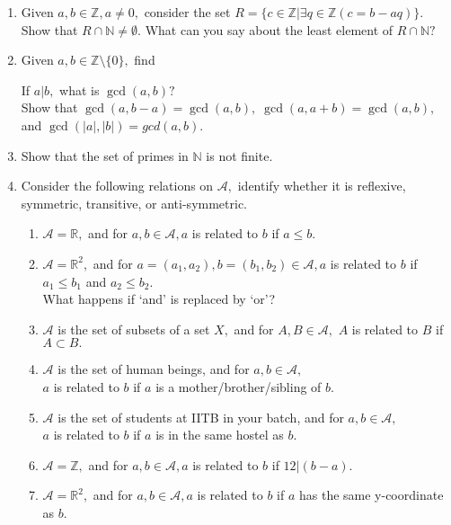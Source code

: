 \begin{enumerate}[label=(\arabic*)]
	\item Given $a, b \in \mathbb{Z}, a\neq0,$ consider the set $R = \{c \in \mathbb{Z}| \exists q \in \mathbb{Z}(c = b - aq)\}.$ Show that $R\cap\mathbb{N}\neq\emptyset.$ What can you say about the least element of $R\cap\mathbb{N}?$
	\item Given $a, b \in \mathbb{Z}\setminus\{0\},$ find
	If $a|b,$ what is $\gcd(a, b)?$\\
	Show that $\gcd(a, b-a) = \gcd(a, b),\;\gcd(a, a+b) = \gcd(a, b),$ and $\gcd(|a|, |b|) = gcd(a, b).$
	\item Show that the set of primes in $\mathbb{N}$ is not finite.
	\item Consider the following relations on $\mathcal{A},$ identify whether it is reflexive, symmetric, transitive, or anti-symmetric.
	\begin{enumerate}[nosep] 
		\item $\mathcal{A} = \mathbb{R},$ and for $a, b \in \mathcal{A}, a$ is related to $b$ if $a \le b.$
		\item $\mathcal{A} = \mathbb{R}^2,$ and for $a = (a_1, a_2), b = (b_1, b_2) \in \mathcal{A}, a$ is related to $b$ if $a_1 \le b_1$ and $a_2 \le b_2.$\\
		What happens if `and' is replaced by `or'?
		\item $\mathcal{A}$ is the set of subsets of a set $X,$ and for $A, B \in \mathcal{A},$ $A$ is related to $B$ if $A \subset B.$
		\item $\mathcal{A}$ is the set of human beings, and for $a, b \in \mathcal{A},$\\
		$a$ is related to $b$ if $a$ is a mother/brother/sibling of $b.$
		\item $\mathcal{A}$ is the set of students at IITB in your batch, and for $a, b \in \mathcal{A},$\\
		$a$ is related to $b$ if $a$ is in the same hostel as $b.$
		\item $\mathcal{A} = \mathbb{Z},$ and for $a, b \in \mathcal{A}, a$ is related to $b$ if $12|(b - a).$
		\item $\mathcal{A} = \mathbb{R}^2,$ and for $a, b \in \mathcal{A}, a$ is related to $b$ if $a$ has the same y-coordinate as $b.$

\end{enumerate}
\end{enumerate}

